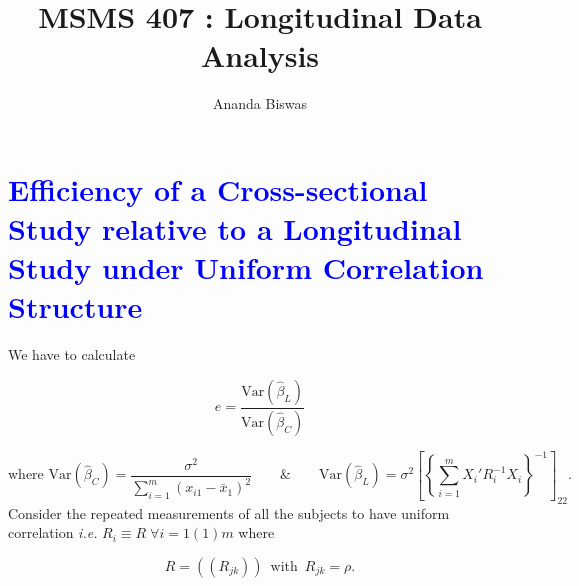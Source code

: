 \documentclass[11pt, a4paper]{article}
\title{MSMS 407 : Longitudinal Data Analysis}
\author{{\fontsize{25}{20} \benyorithafont Ananda Biswas}}
\date{}
\begin{document}
\maketitle

\section*{\faArrowAltCircleRight[regular] \textcolor{blue}{Efficiency of a Cross-sectional Study relative to a Longitudinal Study under Uniform Correlation Structure}}

We have to calculate 

\begin{equation}
e = \dfrac{\text{Var}(\hat{\beta}_L)}{\text{Var}(\hat{\beta}_C)}
\end{equation}

$$\text{where } \text{Var}(\hat{\beta}_C) = \dfrac{\sigma^2}{\sum \limits_{i = 1}^{m} (x_{i1} - \bar{x}_1)^2} \qquad \& \qquad \text{Var}(\hat{\beta}_L) = \sigma^2 \left[ \left\{\sum \limits_{i = 1}^{m} X_i' R_i^{-1} X_i \right\}^{-1} \right]_{22}.
$$
Consider the repeated measurements of all the subjects to have uniform correlation \textit{i.e.} $R_i \equiv R \; \forall i = 1(1)m$ where

$$R = ((R_{jk})) \,\,\, \text{with} \,\,\, R_{jk} = \rho.$$
\end{document}
